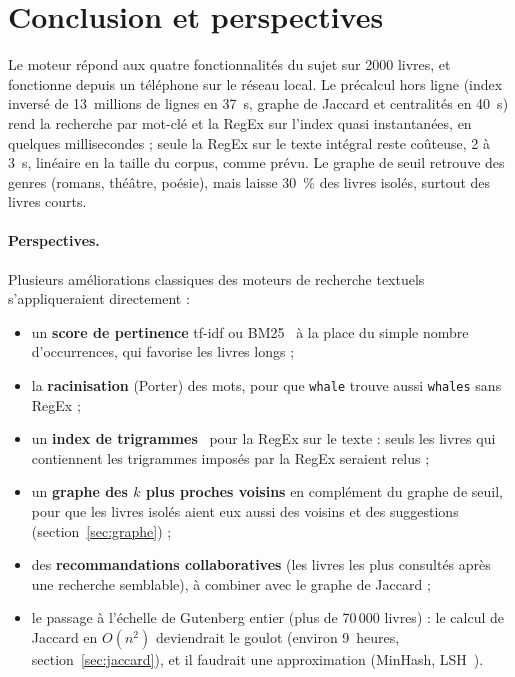 \documentclass[11pt,a4paper]{article}
\newcommand{\motif}[1]{\texttt{#1}}
\begin{document}



\FloatBarrier

\section{Conclusion et perspectives}
\label{sec:conclusion}

Le moteur répond aux quatre fonctionnalités du sujet sur 2000 livres, et
fonctionne depuis un téléphone sur le réseau local. Le précalcul hors ligne
(index inversé de 13~millions de lignes en 37~s, graphe de Jaccard et
centralités en 40~s) rend la recherche par mot-clé et la RegEx sur l'index
quasi instantanées, en quelques millisecondes ; seule la RegEx sur le texte
intégral reste coûteuse, 2 à 3~s, linéaire en la taille du corpus, comme prévu.
Le graphe de seuil retrouve des genres (romans, théâtre, poésie), mais laisse
30~\% des livres isolés, surtout des livres courts.

\paragraph{Perspectives.} Plusieurs améliorations classiques des moteurs de
recherche textuels s'appliqueraient directement :
\begin{itemize}
  \item un \textbf{score de pertinence} tf-idf ou BM25~\cite{bm25} à la place du
        simple nombre d'occurrences, qui favorise les livres longs ;
  \item la \textbf{racinisation} (Porter) des mots, pour que \motif{whale} trouve
        aussi \motif{whales} sans RegEx ;
  \item un \textbf{index de trigrammes}~\cite{trigram} pour la RegEx sur le texte :
        seuls les livres qui contiennent les trigrammes imposés par la RegEx
        seraient relus ;
  \item un \textbf{graphe des $k$ plus proches voisins} en complément du graphe
        de seuil, pour que les livres isolés aient eux aussi des voisins et des
        suggestions (section~\ref{sec:graphe}) ;
  \item des \textbf{recommandations collaboratives} (les livres les plus consultés
        après une recherche semblable), à combiner avec le graphe de Jaccard ;
  \item le passage à l'échelle de Gutenberg entier (plus de 70\,000 livres) :
        le calcul de Jaccard en $O(n^2)$ deviendrait le goulot (environ 9~heures,
        section~\ref{sec:jaccard}), et il faudrait une approximation (MinHash,
        LSH~\cite{mmds}).
\end{itemize}
\end{document}
